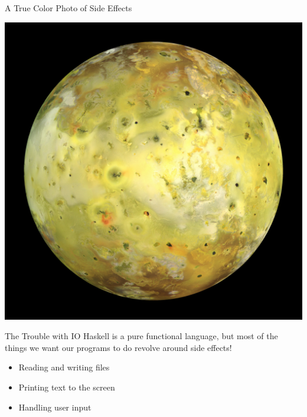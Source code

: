 \documentclass[10pt, presentation, colorlinks]{beamer}
\begin{document}
\begin{frame}[label={sec:orgf8574f8}]{A True Color Photo of Side Effects}
\begin{center}
\includegraphics[height=0.6\textheight]{./img/io.jpg}
\end{center}
\end{frame}

\begin{frame}[label={sec:org489e1aa}]{The Trouble with IO}
Haskell is a \alert{pure functional} language, but most of the things we want our programs to do revolve around \alert{side effects}!

\bigskip

\pause
\begin{itemize}
\item Reading and writing files
\end{itemize}
\pause
\begin{itemize}
\item Printing text to the screen
\end{itemize}
\pause
\begin{itemize}
\item Handling user input
\end{itemize}
\end{frame}
\end{document}
